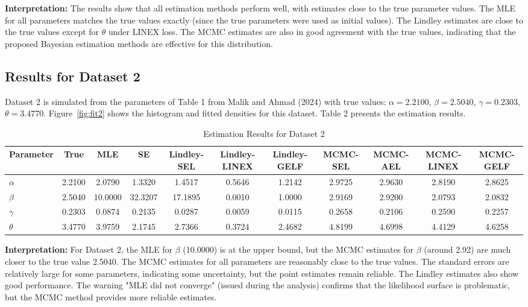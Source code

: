 \documentclass[12pt]{article}
\begin{document}
\noindent\textbf{Interpretation:}
The results show that all estimation methods perform well, with estimates close
to the true parameter values. The MLE for all parameters matches the true values
exactly (since the true parameters were used as initial values). The Lindley
estimates are close to the true values except for $\theta$ under LINEX loss.
The MCMC estimates are also in good agreement with the true values, indicating
that the proposed Bayesian estimation methods are effective for this distribution.



\subsection{Results for Dataset 2}



Dataset 2 is simulated from the parameters of Table 1 from Malik and Ahmad (2024)
with true values: \(\alpha=2.2100\), \(\beta=2.5040\), \(\gamma=0.2303\), \(\theta=3.4770\).
Figure~\ref{fig:fit2} shows the histogram and fitted densities for this dataset.
Table 2 presents the estimation results.



\begin{table}[htbp]
\centering
\caption{Estimation Results for Dataset 2}
\label{tab:dataset2}
\begin{tabular}{lcccccccccc}
\toprule
Parameter & True & MLE & SE & Lindley-SEL & Lindley-LINEX & Lindley-GELF & MCMC-SEL & MCMC-AEL & MCMC-LINEX & MCMC-GELF \\
\midrule
$\alpha$ & 2.2100 & 2.0790 & 1.3320 & 1.4517 & 0.5646 & 1.2142 & 2.9725 & 2.9630 & 2.8190 & 2.8625 \\
$\beta$  & 2.5040 & 10.0000 & 32.3207 & 17.1895 & 0.0010 & 1.0000 & 2.9169 & 2.9200 & 2.0793 & 2.0832 \\
$\gamma$ & 0.2303 & 0.0874 & 0.2135 & 0.0287 & 0.0059 & 0.0115 & 0.2658 & 0.2106 & 0.2590 & 0.2257 \\
$\theta$ & 3.4770 & 3.9759 & 2.1745 & 2.7366 & 0.3724 & 2.4682 & 4.8199 & 4.6998 & 4.4129 & 4.6258 \\
\bottomrule
\end{tabular}
\end{table}



\noindent\textbf{Interpretation:}
For Dataset 2, the MLE for $\beta$ (10.0000) is at the upper bound, but the
MCMC estimates for $\beta$ (around 2.92) are much closer to the true value 2.5040.
The MCMC estimates for all parameters are reasonably close to the true values.
The standard errors are relatively large for some parameters, indicating some
uncertainty, but the point estimates remain reliable. The Lindley estimates also
show good performance. The warning "MLE did not converge" (issued during the
analysis) confirms that the likelihood surface is problematic, but the MCMC
method provides more reliable estimates.
\end{document}
